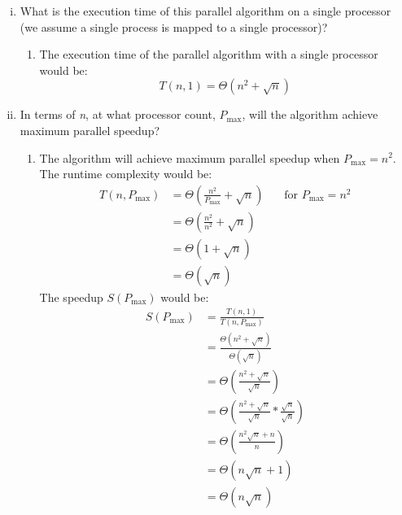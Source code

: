 \documentclass{article}
\begin{document}
    \begin{enumerate}[i.]
        \item What is the execution time of this parallel algorithm on a single processor (we assume a single
        process is mapped to a single processor)?
            \begin{enumerate}
                \item The execution time of the parallel algorithm with a single processor would be:
                \begin{equation}
                    T(n,1) = \Theta(n^2 + \sqrt{n})
                \end{equation}
            \end{enumerate}
        \item In terms of \textit{n}, at what processor count, $P_{\max}$, will the algorithm achieve maximum parallel
        speedup?
            \begin{enumerate}
                \item The algorithm will achieve maximum parallel speedup when $P_{\max} = n^2$. The runtime complexity would be:
                    \begin{align*}
                        T(n, P_{\max}) & = \Theta(\frac{n^2}{P_{\max}} + \sqrt{n}) \phantom{text}\text{for } P_{\max} = n^2 \\
                        & = \Theta(\frac{n^2}{n^2} + \sqrt{n}) \\
                        & = \Theta(1 + \sqrt{n}) \\
                        & = \Theta(\sqrt{n})
                    \end{align*}
                    The speedup $S(P_{\max})$ would be:
                    \begin{align*}
                        S(P_{\max}) & = \frac{T(n,1)}{T(n,P_{\max})} \\
                        & = \frac{\Theta(n^2 + \sqrt{n})}{\Theta(\sqrt{n})} \\
                        & = \Theta(\frac{n^2 + \sqrt{n}}{\sqrt{n}}) \\
                        & = \Theta(\frac{n^2 + \sqrt{n}}{\sqrt{n}} * \frac{\sqrt{n}}{\sqrt{n}} ) \\
                        & = \Theta(\frac{n^2\sqrt{n}  + n}{n}) \\
                        & = \Theta(n\sqrt{n} + 1) \\
                        & = \Theta(n\sqrt{n})
                    \end{align*}

\end{enumerate}
\end{enumerate}
\end{document}
